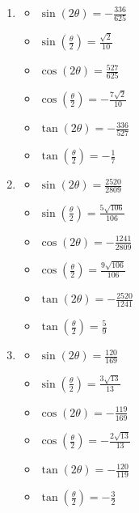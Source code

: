 \documentclass{ximera}
\begin{document}
\begin{enumerate}

\setcounter{enumi}{\value{HW}}

\item \begin{multicols}{3}

\begin{itemize}

\item $\sin(2\theta) = -\frac{336}{625}$
\item $\sin\left(\frac{\theta}{2}\right) = \frac{\sqrt{2}}{10}$
\item $\cos(2\theta) = \frac{527}{625}$
\item $\cos\left(\frac{\theta}{2}\right) = -\frac{7\sqrt{2}}{10}$
\item $\tan(2\theta) = -\frac{336}{527}$
\item $\tan\left(\frac{\theta}{2}\right) = -\frac{1}{7}$

\end{itemize}

\end{multicols}

\item \begin{multicols}{3}

\begin{itemize}

\item $\sin(2\theta) = \frac{2520}{2809}$
\item $\sin\left(\frac{\theta}{2}\right) = \frac{5\sqrt{106}}{106}$
\item $\cos(2\theta) = -\frac{1241}{2809}$
\item $\cos\left(\frac{\theta}{2}\right) = \frac{9\sqrt{106}}{106}$
\item $\tan(2\theta) = -\frac{2520}{1241}$
\item $\tan\left(\frac{\theta}{2}\right) = \frac{5}{9}$

\end{itemize}

\end{multicols}

\item \begin{multicols}{3}

\begin{itemize}

\item $\sin(2\theta) = \frac{120}{169}$
\item $\sin\left(\frac{\theta}{2}\right) = \frac{3\sqrt{13}}{13}$
\item $\cos(2\theta) = -\frac{119}{169}$
\item $\cos\left(\frac{\theta}{2}\right) = -\frac{2\sqrt{13}}{13}$
\item $\tan(2\theta) = -\frac{120}{119}$
\item $\tan\left(\frac{\theta}{2}\right) = -\frac{3}{2}$


\end{itemize}
\end{multicols}
\end{enumerate}
\end{document}
